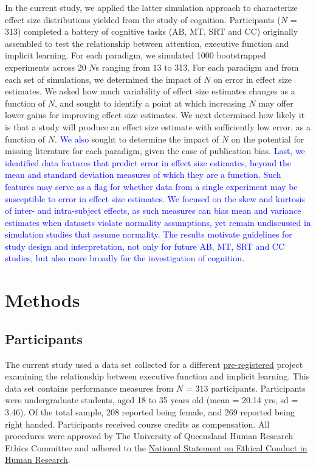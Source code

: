 \documentclass[
  man]{apa6}
\begin{document}
In the current study, we applied the latter simulation approach to characterize effect size distributions yielded from the study of cognition. Participants (\(N\) = 313) completed a battery of cognitive tasks (AB, MT, SRT and CC) originally assembled to test the relationship between attention, executive function and implicit learning. For each paradigm, we simulated 1000 bootstrapped experiments across 20 \(N\)s ranging from 13 to 313. For each paradigm and from each set of simulations, we determined the impact of \(N\) on error in effect size estimates. We asked how much variability of effect size estimates changes as a function of \(N\), and sought to identify a point at which increasing \(N\) may offer lower gains for improving effect size estimates. We next determined how likely it is that a study will produce an effect size estimate with sufficiently low error, as a function of \(N\). \textcolor{blue}{We also} sought to determine the impact of \(N\) on the potential for missing literature for each paradigm, given the case of publication bias. \textcolor{blue}{Last, we identified data features that predict error in effect size estimates, beyond the mean and standard deviation measures of which they are a function. Such features may serve as a flag for whether data from a single experiment may be susceptible to error in effect size estimates. We focused on the skew and kurtosis of inter- and intra-subject effects, as such measures can bias mean and variance estimates when datasets violate normality assumptions, yet remain undiscussed in simulation studies that assume normality. The results motivate guidelines for study design and interpretation, not only for future AB, MT, SRT and CC studies, but also more broadly for the investigation of cognition}.

\hypertarget{methods}{%
\section{Methods}\label{methods}}

\label{sec:Method}

\hypertarget{participants}{%
\subsection{Participants}\label{participants}}

\label{sec:Participants}

The current study used a data set collected for a different \href{https://osf.io/nxysg}{pre-registered} project examining the relationship between executive function and implicit learning. This data set contains performance measures from \(N\) = 313 participants. Participants were undergraduate students, aged 18 to 35 years old (mean = 20.14 yrs, sd = 3.46). Of the total sample, 208 reported being female, and 269 reported being right handed. Participants received course credits as compensation. All procedures were approved by The University of Queensland Human Research Ethics Committee and adhered to the \href{https://www.nhmrc.gov.au/about-us/publications/national-statement-ethical-conduct-human-research-2007-updated-2018}{National Statement on Ethical Conduct in Human Research}.
\end{document}
